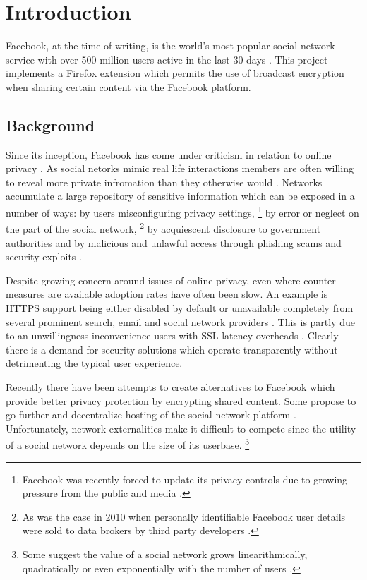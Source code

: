 \chapter{Introduction}\label{ch:introduction}

Facebook, at the time of writing, is the world's most popular social network service with over 500 million users active in the last 30 days \cite{fb-factsheet}. This project implements a Firefox extension which permits the use of broadcast encryption when sharing certain content via the Facebook platform.

\section{Background}

Since its inception, Facebook has come under criticism in relation to online privacy \cite{fb-cipc}. As social netorks mimic real life interactions members are often willing to reveal more private infromation than they otherwise would \cite{gross}. Networks accumulate a large repository of sensitive information which can be exposed in a number of ways: by users misconfiguring privacy settings, \footnote{Facebook was recently forced to update its privacy controls due to growing pressure from the public and media \cite{fb-priv}.} by error or neglect on the part of the social network, \footnote{As was the case in 2010 when personally identifiable Facebook user details were sold to data brokers by third party developers \cite{fb-ids}.} by acquiescent disclosure to government authorities and by malicious and unlawful access through phishing scams and security exploits \cite{fb-gov} \cite{fb-phish} \cite{rockyou}. 

Despite growing concern around issues of online privacy, even where counter measures are available adoption rates have often been slow. An example is HTTPS support being either disabled by default or unavailable completely from several prominent search, email and social network providers \cite{https}. This is partly due to an unwillingness inconvenience users with SSL latency overheads \cite{https2}. Clearly there is a demand for security solutions which operate transparently without detrimenting the typical user experience.
  
Recently there have been attempts to create alternatives to Facebook \cite{pidder} which provide better privacy protection by encrypting shared content. Some propose to go further and decentralize hosting of the social network platform \cite{diaspora}. Unfortunately, network externalities make it difficult to compete since the utility of a social network depends on the size of its userbase. \footnote{Some suggest the value of a social network grows linearithmically, quadratically or even exponentially with the number of users \cite{fb-network} \cite{metcalf}.}

